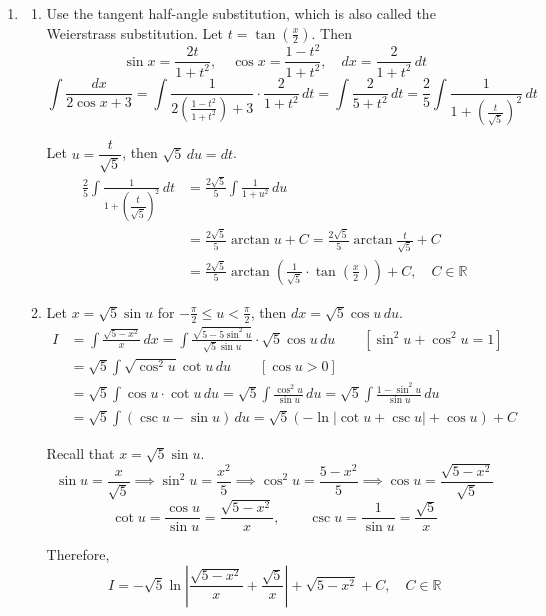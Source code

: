 \documentclass[a4paper, 12pt]{article}
\begin{document}

\begin{enumerate}[leftmargin=*,label=\textbf{\arabic*.}]
\item
\begin{enumerate}[leftmargin=*,label=\textbf{\alph*.}]
\item Use the tangent half-angle substitution, which is also called the Weierstrass substitution. Let $t=\tan\left(\frac x2\right)$. Then
\[\sin x={\frac{2t}{1+t^{2}}},\quad\cos x={\frac{1-t^{2}}{1+t^{2}}},\quad dx={\frac2{1+t^{2}}}\,dt\]
\[\int\frac{dx}{2\cos x+3}=\int\frac1{2\left(\frac{1-t^2}{1+t^2}\right)+3}\cdot\frac2{1+t^2}\,dt=\int\frac2{5+t^2}\,dt=\frac25\int\frac1{1+\left(\frac t{\sqrt5}\right)^2}\,dt\]

Let $u=\dfrac t{\sqrt5}$, then $\sqrt5\,du=dt$.
\begin{align*}\frac25\int\frac1{1+\left(\dfrac t{\sqrt5}\right)^2}\,dt&=\frac{2\sqrt5}5\int\frac1{1+u^2}\,du\\[1em]&=\frac{2\sqrt5}5\arctan u+C=\frac{2\sqrt5}5\arctan\frac t{\sqrt5}+C\\[1em]&=\boxed{\frac{2\sqrt5}5\arctan\left(\frac1{\sqrt5}\cdot\tan\left(\frac x2\right)\right)+C,\quad C\in\mathbb{R}}\end{align*}

\item Let $\displaystyle x=\sqrt5\sin u$ for $\displaystyle-\frac\pi2\leq u<\frac\pi2$, then $dx=\displaystyle\sqrt5\cos u\,du$.
\begin{align*}I&=\int\frac{\sqrt{5-x^2}}{x}\,dx=\int\frac{\sqrt{5-5\sin^2u}}{\sqrt5\sin u}\cdot\sqrt5\cos u\,du\qquad\left[\sin^2u+\cos^2u=1\right]\\[1em]&=\sqrt5\int\sqrt{\cos^2u}\cot u\,du\qquad\left[\cos u>0\right]\\[1em]&=\sqrt5\int\cos u\cdot\cot u\,du=\sqrt5\int\frac{\cos^2u}{\sin u}\,du=\sqrt5\int\frac{1-\sin^2u}{\sin u}\,du\\[1em]&=\sqrt5\int\left(\csc u-\sin u\right)\,du=\sqrt5\left(-\ln\left|\cot u+\csc u\right|+\cos u\right)+C\end{align*}

Recall that $\displaystyle x=\sqrt5\sin u$.
\[\sin u=\frac x{\sqrt5}\implies\sin^2u=\frac{x^2}5\implies\cos^2 u=\frac{5-x^2}5\implies\cos u=\frac{\sqrt{5-x^2}}{\sqrt5}\]
\[\cot u=\frac{\cos u}{\sin u}=\frac{\sqrt{5-x^2}}x,\qquad\csc u=\frac1{\sin u}=\frac{\sqrt5}x\]

Therefore,
\[\boxed{I=-\sqrt5\ln\left|\frac{\sqrt{5-x^2}}x+\frac{\sqrt5}x\right|+\sqrt{5-x^2}+C,\quad C\in\mathbb{R}}\]


\end{enumerate}
\end{enumerate}
\end{document}

